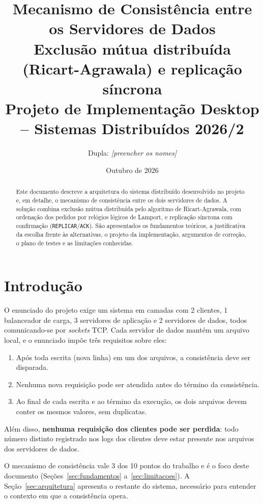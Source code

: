 \documentclass[11pt,a4paper]{article}
\title{\textbf{Mecanismo de Consistência entre os Servidores de Dados}\\[4pt]
\large Exclusão mútua distribuída (Ricart-Agrawala) e replicação síncrona\\[2pt]
\normalsize Projeto de Implementação Desktop -- Sistemas Distribuídos 2026/2}
\author{Dupla: \textit{[preencher os nomes]}}
\date{Outubro de 2026}
\newcommand{\msg}[1]{\texttt{#1}}
\begin{document}
\maketitle

\begin{abstract}
Este documento descreve a arquitetura do sistema distribuído desenvolvido no projeto e,
em detalhe, o mecanismo de consistência entre os dois servidores de dados. A solução
combina exclusão mútua distribuída pelo algoritmo de Ricart-Agrawala, com ordenação dos
pedidos por relógios lógicos de Lamport, e replicação síncrona com confirmação
(\msg{REPLICAR}/\msg{ACK}). São apresentados os fundamentos teóricos, a justificativa
da escolha frente às alternativas, o projeto da implementação, argumentos de correção,
o plano de testes e as limitações conhecidas.
\end{abstract}

\tableofcontents
\bigskip

\section{Introdução}

O enunciado do projeto exige um sistema em camadas com 2 clientes, 1 balanceador de
carga, 3 servidores de aplicação e 2 servidores de dados, todos comunicando-se por
\emph{sockets} TCP. Cada servidor de dados mantém um arquivo local, e o enunciado
impõe três requisitos sobre eles:

\begin{enumerate}[label=\textbf{R\arabic*.}]
  \item Após toda escrita (nova linha) em um dos arquivos, a consistência deve ser
        disparada.
  \item Nenhuma nova requisição pode ser atendida antes do término da consistência.
  \item Ao final de cada escrita e ao término da execução, os dois arquivos devem
        conter os mesmos valores, sem duplicatas.
\end{enumerate}

Além disso, \textbf{nenhuma requisição dos clientes pode ser perdida}: todo número
distinto registrado nos logs dos clientes deve estar presente nos arquivos dos
servidores de dados.

O mecanismo de consistência vale 3 dos 10 pontos do trabalho e é o foco deste
documento (Seções~\ref{sec:fundamentos} a~\ref{sec:limitacoes}). A
Seção~\ref{sec:arquitetura} apresenta o restante do sistema, necessário para entender
o contexto em que a consistência opera.
\end{document}
